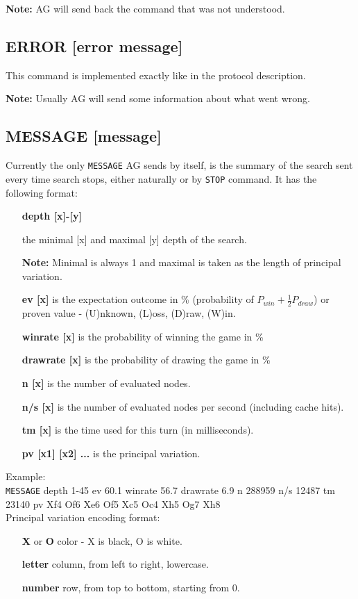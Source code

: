 \documentclass[12pt,a4paper]{article}
\begin{document}
\textbf{Note:} AG will send back the command that was not understood.


\subsection{ERROR [error message]}
\label{cmd_error}
This command is implemented exactly like in the protocol description.

\textbf{Note:} Usually AG will send some information about what went wrong.


\subsection{MESSAGE [message]}
\label{cmd_message}
Currently the only \texttt{MESSAGE} AG sends by itself, is the summary of the search sent every time search stops, either naturally or by \texttt{STOP} command. It has the following format:\\
\begin{enumerate}[leftmargin=7.5em]
\item[\textbf{depth [x]-[y]}]{the minimal [x] and maximal [y] depth of the search.

\textbf{Note:} Minimal is always 1 and maximal is taken as the length of principal variation.}
\item[\textbf{ev [x]}]{is the expectation outcome in {\%} (probability of $P_{win} + \frac{1}{2}P_{draw}$) or proven value - (U)nknown, (L)oss, (D)raw, (W)in.}
\item[\textbf{winrate [x]}]{is the probability of winning the game in {\%}}
\item[\textbf{drawrate [x]}]{is the probability of drawing the game in {\%}}
\item[\textbf{n [x]}]{is the number of evaluated nodes.}
\item[\textbf{n/s [x]}]{is the number of evaluated nodes per second (including cache hits).}
\item[\textbf{tm [x]}]{is the time used for this turn (in milliseconds).}
\item[\textbf{pv [x1] [x2] ...}]{is the principal variation.}
\end{enumerate}

Example:\\
\texttt{MESSAGE} depth 1-45 ev 60.1 winrate 56.7 drawrate 6.9 n 288959 n/s 12487 tm 23140 pv Xf4 Of6 Xe6 Of5 Xc5 Oc4 Xh5 Og7 Xh8 \\

Principal variation encoding format:
\begin{enumerate}[leftmargin=7.5em]
\item[\textbf{X} or \textbf{O}]{color - X is black, O is white.}
\item[\textbf{letter}]{column, from left to right, lowercase.}
\item[\textbf{number}]{row, from top to bottom, starting from 0.}
\end{enumerate}
\end{document}
